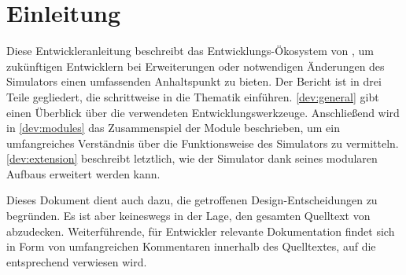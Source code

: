 
\section{Einleitung}

Diese Entwickleranleitung beschreibt das Entwicklungs-Ökosystem von \erasim{},
um zukünftigen Entwicklern bei Erweiterungen oder notwendigen Änderungen des
Simulators einen umfassenden Anhaltspunkt zu bieten. Der Bericht ist in drei
Teile gegliedert, die schrittweise in die Thematik einführen.
\autoref{dev:general} gibt einen Überblick über die verwendeten
Entwicklungswerkzeuge. Anschließend wird in \autoref{dev:modules} das
Zusammenspiel der Module beschrieben, um ein umfangreiches Verständnis über die
Funktionsweise des Simulators zu vermitteln. \autoref{dev:extension} beschreibt
letztlich, wie der Simulator dank seines modularen Aufbaus erweitert werden
kann.

Dieses Dokument dient auch dazu, die getroffenen Design-Entscheidungen zu
begründen. Es ist aber keineswegs in der Lage, den gesamten Quelltext von
\erasim{} abzudecken. Weiterführende, für Entwickler relevante Dokumentation
findet sich in Form von umfangreichen Kommentaren innerhalb des Quelltextes, auf
die entsprechend verwiesen wird.
